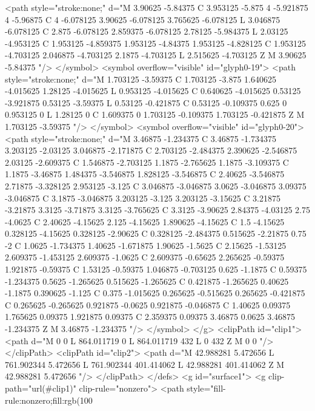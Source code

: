 <path style="stroke:none;" d="M 3.90625 -5.84375 C 3.953125 -5.875 4 -5.921875 4 -5.96875 C 4 -6.078125 3.90625 -6.078125 3.765625 -6.078125 L 3.046875 -6.078125 C 2.875 -6.078125 2.859375 -6.078125 2.78125 -5.984375 L 2.03125 -4.953125 C 1.953125 -4.859375 1.953125 -4.84375 1.953125 -4.828125 C 1.953125 -4.703125 2.046875 -4.703125 2.1875 -4.703125 L 2.515625 -4.703125 Z M 3.90625 -5.84375 "/>
</symbol>
<symbol overflow="visible" id="glyph0-19">
<path style="stroke:none;" d="M 1.703125 -3.59375 C 1.703125 -3.875 1.640625 -4.015625 1.28125 -4.015625 L 0.953125 -4.015625 C 0.640625 -4.015625 0.53125 -3.921875 0.53125 -3.59375 L 0.53125 -0.421875 C 0.53125 -0.109375 0.625 0 0.953125 0 L 1.28125 0 C 1.609375 0 1.703125 -0.109375 1.703125 -0.421875 Z M 1.703125 -3.59375 "/>
</symbol>
<symbol overflow="visible" id="glyph0-20">
<path style="stroke:none;" d="M 3.46875 -1.234375 C 3.46875 -1.734375 3.203125 -2.03125 3.046875 -2.171875 C 2.703125 -2.484375 2.390625 -2.546875 2.03125 -2.609375 C 1.546875 -2.703125 1.1875 -2.765625 1.1875 -3.109375 C 1.1875 -3.46875 1.484375 -3.546875 1.828125 -3.546875 C 2.40625 -3.546875 2.71875 -3.328125 2.953125 -3.125 C 3.046875 -3.046875 3.0625 -3.046875 3.09375 -3.046875 C 3.1875 -3.046875 3.203125 -3.125 3.203125 -3.15625 C 3.21875 -3.21875 3.3125 -3.71875 3.3125 -3.765625 C 3.3125 -3.90625 2.84375 -4.03125 2.75 -4.0625 C 2.40625 -4.15625 2.125 -4.15625 1.890625 -4.15625 C 1.5 -4.15625 0.328125 -4.15625 0.328125 -2.90625 C 0.328125 -2.484375 0.515625 -2.21875 0.75 -2 C 1.0625 -1.734375 1.40625 -1.671875 1.90625 -1.5625 C 2.15625 -1.53125 2.609375 -1.453125 2.609375 -1.0625 C 2.609375 -0.65625 2.265625 -0.59375 1.921875 -0.59375 C 1.53125 -0.59375 1.046875 -0.703125 0.625 -1.1875 C 0.59375 -1.234375 0.5625 -1.265625 0.515625 -1.265625 C 0.421875 -1.265625 0.40625 -1.1875 0.390625 -1.125 C 0.375 -1.015625 0.265625 -0.515625 0.265625 -0.421875 C 0.265625 -0.265625 0.921875 -0.0625 0.921875 -0.046875 C 1.40625 0.09375 1.765625 0.09375 1.921875 0.09375 C 2.359375 0.09375 3.46875 0.0625 3.46875 -1.234375 Z M 3.46875 -1.234375 "/>
</symbol>
</g>
<clipPath id="clip1">
  <path d="M 0 0 L 864.011719 0 L 864.011719 432 L 0 432 Z M 0 0 "/>
</clipPath>
<clipPath id="clip2">
  <path d="M 42.988281 5.472656 L 761.902344 5.472656 L 761.902344 401.414062 L 42.988281 401.414062 Z M 42.988281 5.472656 "/>
</clipPath>
</defs>
<g id="surface1">
<g clip-path="url(#clip1)" clip-rule="nonzero">
<path style="fill-rule:nonzero;fill:rgb(100%
